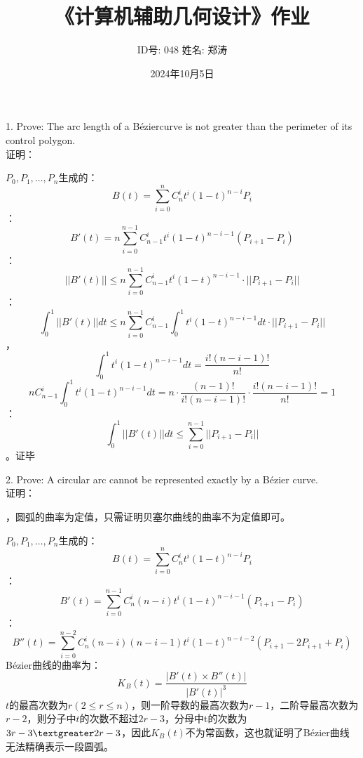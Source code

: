 \documentclass{article}
\newcommand{\Bezier}{B\'ezier}%
\begin{document}
	
	\title{《计算机辅助几何设计》作业}
	\author{ID号: 048  \qquad  姓名: 郑涛}  %
	\date{2024年10月5日}
	\maketitle
	
	
	1. Prove: The arc length of a \Bezier curve is not greater than the perimeter
	of its control polygon.\\
	证明：
	
	$P_0,P_1,\dots,P_n$生成的：
	$$B(t)=\sum_{i=0}^{n}C_n^it^i(1-t)^{n-i}P_i$$
	：
	$$B'(t)=n\sum_{i=0}^{n-1}C_{n-1}^it^i(1-t)^{n-i-1}(P_{i+1}-P_i)$$
	：
	$$||B'(t)||\leq n\sum_{i=0}^{n-1}C_{n-1}^it^i(1-t)^{n-i-1}\cdot||P_{i+1}-P_i||$$
	：
	$$\int_{0}^{1}||B'(t)||dt\leq n\sum_{i=0}^{n-1}C_{n-1}^i\int_{0}^{1}t^i(1-t)^{n-i-1}dt\cdot||P_{i+1}-P_i||$$
	，
	$$\int_{0}^{1}t^i(1-t)^{n-i-1}dt = \frac{i!(n-i-1)!}{n!}$$
	$$nC_{n-1}^i\int_{0}^{1}t^i(1-t)^{n-i-1}dt=n\cdot \frac{(n-1)!}{i!(n-i-1)!}\cdot\frac{i!(n-i-1)!}{n!}=1$$
	：
	$$\int_{0}^{1}||B'(t)||dt\leq\sum_{i=0}^{n-1}||P_{i+1}-P_i||$$
	。证毕
	
	
	2. Prove: A circular arc cannot be represented exactly by a Bézier curve.\\
	证明：
	
	，圆弧的曲率为定值，只需证明贝塞尔曲线的曲率不为定值即可。
	
	$P_0,P_1,\dots,P_n$生成的：
	$$B(t)=\sum_{i=0}^{n}C_n^it^i(1-t)^{n-i}P_i$$
	：
	$$B'(t)=\sum_{i=0}^{n-1}C_n^i(n-i)t^i(1-t)^{n-i-1}(P_{i+1}-P_i)$$
	：
	$$B''(t)=\sum_{i=0}^{n-2}C_n^i(n-i)(n-i-1)t^i(1-t)^{n-i-2}(P_{i+1}-2P_{i+1}+P_i)$$
	\qquad Bézier曲线的曲率为：
	$$K_B(t)=\frac{|B'(t)\times B''(t)|}{|B'(t)|^3}$$
	$t$的最高次数为$r(2\leq r\leq n)$，则一阶导数的最高次数为$r-1$，二阶导最高次数为$r-2$，则分子中$t$的次数不超过$2r-3$，分母中t的次数为$3r-3\textgreater 2r-3$，因此$K_B(t)$不为常函数，这也就证明了Bézier曲线无法精确表示一段圆弧。
	
\end{document}
